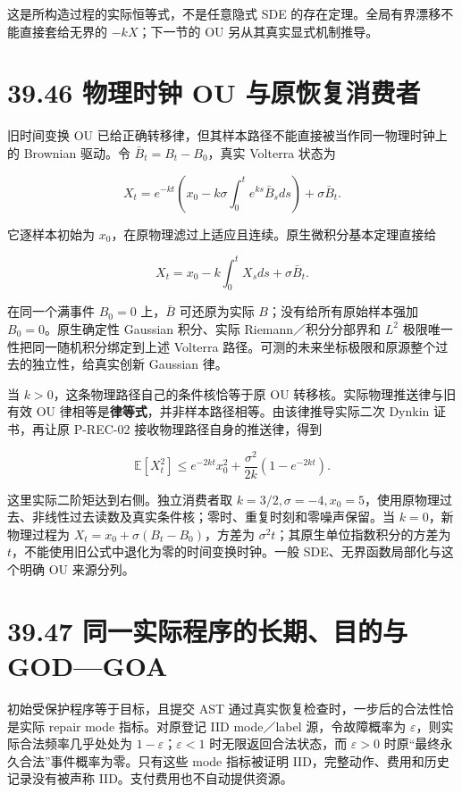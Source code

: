 \documentclass[
  11pt,
  oneside]{book}
\begin{document}
这是所构造过程的实际恒等式，不是任意隐式 SDE 的存在定理。全局有界漂移不能直接套给无界的 \(-kX\)；下一节的 OU 另从其真实显式机制推导。

\section{39.46 物理时钟 OU 与原恢复消费者}\label{ux7269ux7406ux65f6ux949f-ou-ux4e0eux539fux6062ux590dux6d88ux8d39ux8005}

旧时间变换 OU 已给正确转移律，但其样本路径不能直接被当作同一物理时钟上的 Brownian 驱动。令 \(\bar B_t=B_t-B_0\)，真实 Volterra 状态为

\[X_t=e^{-kt}\left(x_0-k\sigma\int_0^t e^{ks}\bar B_sds\right)
+\sigma\bar B_t.\]

它逐样本初始为 \(x_0\)，在原物理滤过上适应且连续。原生微积分基本定理直接给

\[X_t=x_0-k\int_0^t X_sds+\sigma\bar B_t.\]

在同一个满事件 \(B_0=0\) 上，\(\bar B\) 可还原为实际 \(B\)；没有给所有原始样本强加 \(B_0=0\)。原生确定性 Gaussian 积分、实际 Riemann／积分分部界和 \(L^2\) 极限唯一性把同一随机积分绑定到上述 Volterra 路径。可测的未来坐标极限和原源整个过去的独立性，给真实创新 Gaussian 律。

当 \(k>0\)，这条物理路径自己的条件核恰等于原 OU 转移核。实际物理推送律与旧有效 OU 律相等是\textbf{律等式}，并非样本路径相等。由该律推导实际二次 Dynkin 证书，再让原 P-REC-02 接收物理路径自身的推送律，得到

\[\mathbb E[X_t^2]\le e^{-2kt}x_0^2+
\frac{\sigma^2}{2k}(1-e^{-2kt}).\]

这里实际二阶矩达到右侧。独立消费者取 \(k=3/2,\sigma=-4,x_0=5\)，使用原物理过去、非线性过去读数及真实条件核；零时、重复时刻和零噪声保留。当 \(k=0\)，新物理过程为 \(X_t=x_0+\sigma(B_t-B_0)\)，方差为 \(\sigma^2t\)；其原生单位指数积分的方差为 \(t\)，不能使用旧公式中退化为零的时间变换时钟。一般 SDE、无界函数局部化与这个明确 OU 来源分列。

\section{39.47 同一实际程序的长期、目的与 GOD---GOA}\label{ux540cux4e00ux5b9eux9645ux7a0bux5e8fux7684ux957fux671fux76eeux7684ux4e0e-godgoa}

初始受保护程序等于目标，且提交 AST 通过真实恢复检查时，一步后的合法性恰是实际 repair mode 指标。对原登记 IID mode／label 源，令故障概率为 \(\varepsilon\)，则实际合法频率几乎处处为 \(1-\varepsilon\)；\(\varepsilon<1\) 时无限返回合法状态，而 \(\varepsilon>0\) 时原``最终永久合法''事件概率为零。只有这些 mode 指标被证明 IID，完整动作、费用和历史记录没有被声称 IID。支付费用也不自动提供资源。
\end{document}
